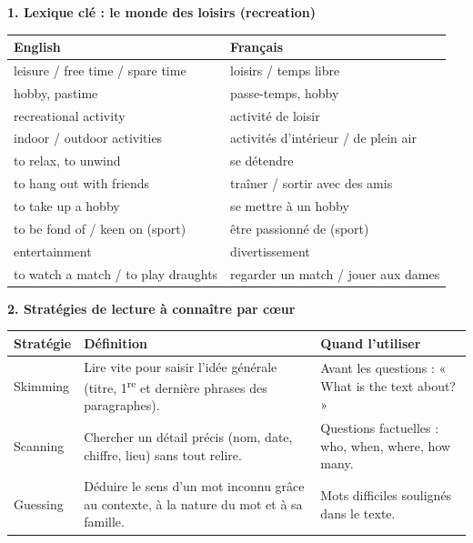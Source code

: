 \documentclass[11pt]{article}
\newcommand{\cle}[1]{{\popxbold\color{popdark}#1}}
\providecommand{\iere}{\textsuperscript{re}}\providecommand{\ieme}{\textsuperscript{e}}\providecommand{\ere}{\textsuperscript{re}}\providecommand{\eme}{\textsuperscript{e}}\providecommand{\er}{\textsuperscript{er}}\providecommand{\ie}{\textsuperscript{e}}
\begin{document}
\begin{bilan}
\textbf{1. Lexique clé : le monde des loisirs (recreation)}
\begin{center}
\begin{tabularx}{\linewidth}{|X|X|}
\hline
\rowcolor{popblueL} English & Français \\
\hline
leisure / free time / spare time & loisirs / temps libre \\
\hline
hobby, pastime & passe-temps, hobby \\
\hline
recreational activity & activité de loisir \\
\hline
indoor / outdoor activities & activités d'intérieur / de plein air \\
\hline
to relax, to unwind & se détendre \\
\hline
to hang out with friends & traîner / sortir avec des amis \\
\hline
to take up a hobby & se mettre à un hobby \\
\hline
to be fond of / keen on (sport) & être passionné de (sport) \\
\hline
entertainment & divertissement \\
\hline
to watch a match / to play draughts & regarder un match / jouer aux dames \\
\hline
\end{tabularx}
\end{center}

\textbf{2. Stratégies de lecture à connaître par c\oe ur}
\begin{center}
\begin{tabularx}{\linewidth}{|l|X|X|}
\hline
\rowcolor{popblueL} Stratégie & Définition & Quand l'utiliser \\
\hline
\cle{Skimming} & Lire vite pour saisir l'idée générale (titre, 1\iere{} et dernière phrases des paragraphes). & Avant les questions : « What is the text about? » \\
\hline
\cle{Scanning} & Chercher un détail précis (nom, date, chiffre, lieu) sans tout relire. & Questions factuelles : who, when, where, how many. \\
\hline
\cle{Guessing} & Déduire le sens d'un mot inconnu grâce au contexte, à la nature du mot et à sa famille. & Mots difficiles soulignés dans le texte. \\
\hline
\end{tabularx}
\end{center}


\end{bilan}
\end{document}
